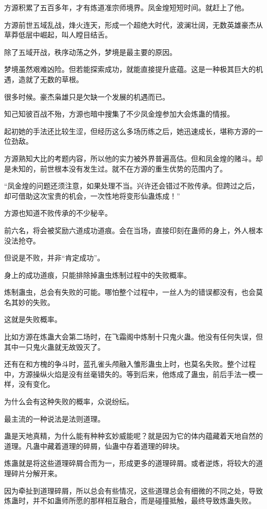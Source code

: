 \begin{this_body}
方源积累了五百多年，才有炼道准宗师境界。凤金煌短短时间。就赶上了他。

方源前世五域乱战，烽火连天，形成一个超绝大时代，波澜壮阔，无数英雄豪杰从草莽低层中崛起，叫人瞠目结舌。

除了五域开战，秩序动荡之外，梦境是最主要的原因。

梦境虽然艰难凶险。但若能探索成功，就能直接提升底蕴。这是一种极其巨大的机遇，造就了无数的草根。

很多时候。豪杰枭雄只是欠缺一个发展的机遇而已。

知己知彼百战不殆，方源也暗中搜集了不少凤金煌参加大会炼蛊的情报。

起初她的手法还比较生涩，但经历这么多场历练之后，她迅速成长，堪称方源的一位劲敌。

方源熟知大比的考题内容，所以他的实力被外界普遍高估。但和凤金煌的赌斗。却是未知的，前世根本没有发生过。就不在方源的重生优势的范围内了。

“凤金煌的问题还须注意，如果处理不当。兴许还会错过不败传承。但跨过之后，却可借助这次宝贵的机会，一次性地将变形仙蛊炼成！”

方源也知道不败传承的不少秘辛。

前六名，将会被奖励六道成功道痕。会在当场，直接印刻在蛊师的身上，外人根本没法抢夺。

但说是不败，并非“肯定成功”。

身上的成功道痕，只能排除掉蛊虫炼制过程中的失败概率。

炼制蛊虫，总会有失败的可能。哪怕整个过程中，一丝人为的错误都没有，也会莫名其妙的失败。

这就是失败概率。

比如方源在炼蛊大会第二场时，在飞霜阁中炼制十只鬼火蛊。他没有任何失误，但其中一只鬼火蛊就无故毁灭了。

还有在和方槐的争斗时，蓝孔雀头颅融入雏形蛊虫上时，也莫名失败。整个过程中，方源操纵火焰是没有丝毫错失的。等到后来，他炼成了蛊虫，前后手法一模一样，没有变化。

为什么会有这种失败的概率，众说纷纭。

最主流的一种说法是法则道理。

蛊是天地真精，为什么能有种种玄妙威能呢？就是因为它的体内蕴藏着天地自然的道理。凡蛊中藏着道理的碎屑，仙蛊中存着道理的碎块。

炼蛊就是将这些道理碎屑合而为一，形成更多的道理碎屑。或者逆炼，将较大的道理碎片分解开来。

因为牵扯到道理碎屑，所以总会有些情况，这些道理总会有细微的不同之处，导致炼蛊时，并不如蛊师所愿的那样相互融合，而是碰撞抵触，最终导致炼蛊失败。


\end{this_body}
